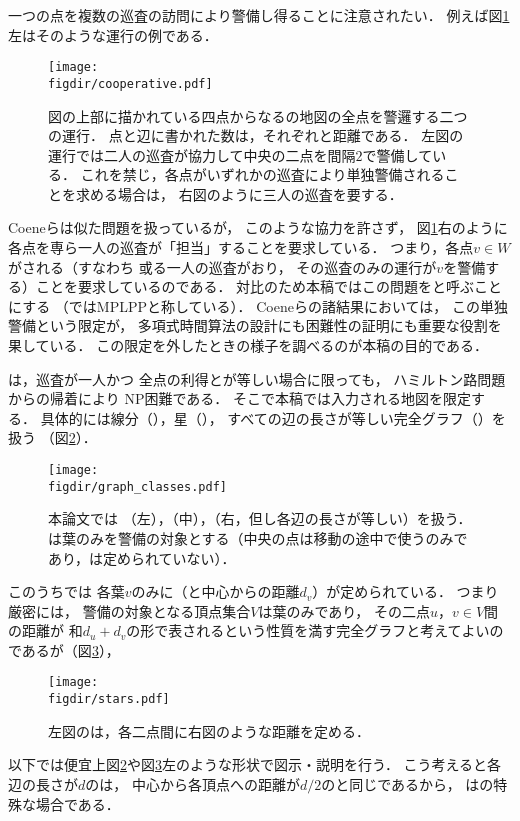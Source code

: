 一つの点を複数の巡査の訪問により警備し得ることに注意されたい．
例えば図\ref{figure: cooperative}左はそのような運行の例である．
\begin{figure}
  \centering
  \texttt{[image: \\figdir/cooperative.pdf]}
  \caption{図の上部に描かれている四点からなる{\graphLine}の地図の全点を警邏する二つの運行．
    点と辺に書かれた数は，それぞれ{\maxIdletime}と距離である．
    左図の運行では二人の巡査が協力して中央の二点を間隔$2$で警備している．
    これを禁じ，各点がいずれかの巡査により単独警備されることを求める場合は，
    右図のように三人の巡査を要する．}
  \label{figure: cooperative}
\end{figure}
Coeneら\cite{coene2011charlemagne}は似た問題を扱っているが，
このような協力を許さず，
図\ref{figure: cooperative}右のように
各点を専ら一人の巡査が「担当」することを要求している．
つまり，各点$v \in W$がされる（すなわち
或る一人の巡査がおり，
その巡査のみの運行が$v$を警備する）ことを要求しているのである．
対比のため本稿ではこの問題を{\independentPatProb}と呼ぶことにする
（\cite{coene2011charlemagne}ではMPLPPと称している）．
Coeneら\cite{coene2011charlemagne}の諸結果においては，
この単独警備という限定が，
多項式時間算法の設計にも困難性の証明にも重要な役割を果している．
この限定を外したときの様子を調べるのが本稿の目的である．

{\patProb}は，巡査が一人かつ
全点の利得と{\maxIdletime}が等しい場合に限っても，
ハミルトン路問題からの帰着により
NP困難である\cite[Theorem~8]{coene2011charlemagne}．
そこで本稿では入力される地図を限定する．
具体的には線分（{\graphLine}），星（{\graphStar}），
すべての辺の長さが等しい完全グラフ（{\graphUnit}）を扱う
（図\ref{figure: graph_classes}）．
\begin{figure}
  \centering
  \texttt{[image: \\figdir/graph\_classes.pdf]}
  \caption{本論文では
    {\graphLine}（左），{\graphStar}（中），{\graphUnit}（右，但し各辺の長さが等しい）を扱う．
    {\graphStar}は葉のみを警備の対象とする（中央の点は移動の途中で使うのみであり，{\maxIdletime}は定められていない）．}
  \label{figure: graph_classes}
\end{figure}
このうち{\graphStar}では
各葉$v$のみに{\maxIdletime}（と中心からの距離$d _v$）が定められている．
つまり厳密には，
警備の対象となる頂点集合$V$は葉のみであり，
その二点$u$，$v \in V$間の距離が
和$d _u + d _v$の形で表されるという性質を満す完全グラフと考えてよいのであるが（図\ref{figure: stars}），
\begin{figure}
  \centering
  \texttt{[image: \\figdir/stars.pdf]}
  \caption{左図の{\graphStar}は，各二点間に右図のような距離を定める．}
  \label{figure: stars}
\end{figure}
以下では便宜上図\ref{figure: graph_classes}や図\ref{figure: stars}左のような形状で図示・説明を行う．
こう考えると各辺の長さが$d$の{\graphUnit}は，
中心から各頂点への距離が$d/2$の{\graphStar}と同じであるから，
{\graphUnit}は{\graphStar}の特殊な場合である．

